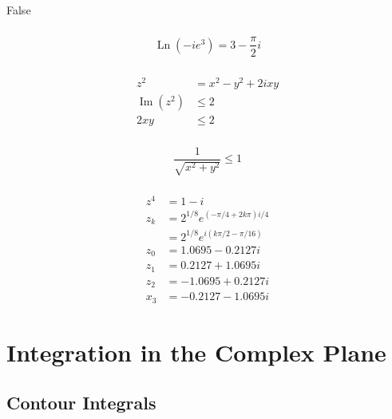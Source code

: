 \documentclass{article}
\renewcommand{\Im}{\operatorname{Im}}
\newcommand{\Ln}{\operatorname{Ln}}
\begin{document}
False

\setcounter{subsubsection}{14}
\subsubsection{}

\[\Ln (-i e^3) = 3 - \frac{\pi}{2} i\]

\setcounter{subsubsection}{20}
\subsubsection{}

\begin{align*}
  z^2       & = x^2 - y^2 + 2 i x y \\
  \Im (z^2) & \le 2                 \\
  2 x y     & \le 2
\end{align*}

\setcounter{subsubsection}{22}
\subsubsection{}

\[\frac{1}{\sqrt{x^2 + y^2}} \le 1\]

\setcounter{subsubsection}{26}
\subsubsection{}

\begin{align*}
  z^4 & = 1 - i                                    \\
  z_k & = 2^{1 / 8} e^{(-\pi / 4 + 2 k \pi) i / 4} \\
      & = 2^{1 / 8} e^{i (k \pi / 2 - \pi / 16)}   \\
  z_0 & = 1.0695 - 0.2127 i                        \\
  z_1 & = 0.2127 + 1.0695 i                        \\
  z_2 & = -1.0695 + 0.2127 i                       \\
  x_3 & = -0.2127 - 1.0695 i
\end{align*}

\section{Integration in the Complex Plane}

\subsection{Contour Integrals}
\end{document}
